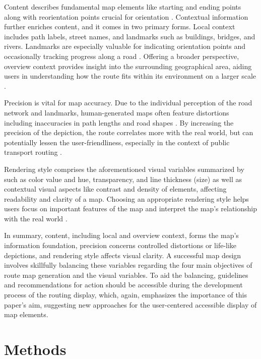 \documentclass[agile, final]{copernicus-agile}
\begin{document}
Content describes fundamental map elements like starting and ending points along with reorientation points crucial for orientation \citep{Denis1997}. Contextual information further enriches content, and it comes in two primary forms. Local context includes path labels, street names, and landmarks such as buildings, bridges, and rivers. Landmarks are especially valuable for indicating orientation points and occasionally tracking progress along a road \citep{Denis1997}. Offering a broader perspective, overview context provides insight into the surrounding geographical area, aiding users in understanding how the route fits within its environment on a larger scale \citep{AgrawalaStolte2000}. 

Precision is vital for map accuracy. Due to the individual perception of the road network and landmarks, human-generated maps often feature distortions including inaccuracies in path lengths and road shapes \citep{Tversky1992}. By increasing the precision of the depiction, the route correlates more with the real world, but can potentially lessen the user-friendliness, especially in the context of public transport routing \citep{AgrawalaStolte2000}.

Rendering style comprises the aforementioned visual variables summarized by \citet{Roth2017} such as color value and hue, transparency, and line thickness (size) as well as contextual visual aspects like contrast and density of elements, affecting readability and clarity of a map. Choosing an appropriate rendering style helps users focus on important features of the map and interpret the map's relationship with the real world \citep{Agrawala2002, AgrawalaStolte2000, Sennekamp2022}.

In summary, content, including local and overview context, forms the map's information foundation, precision concerns controlled distortions or life-like depictions, and rendering style affects visual clarity. A successful map design involves skillfully balancing these variables regarding the four main objectives of route map generation and the visual variables. To aid the balancing, guidelines and recommendations for action should be accessible during the development process of the routing display, which, again, emphasizes the importance of this paper's aim, suggesting new approaches for the user-centered accessible display of map elements.


\section{Methods}
\end{document}
